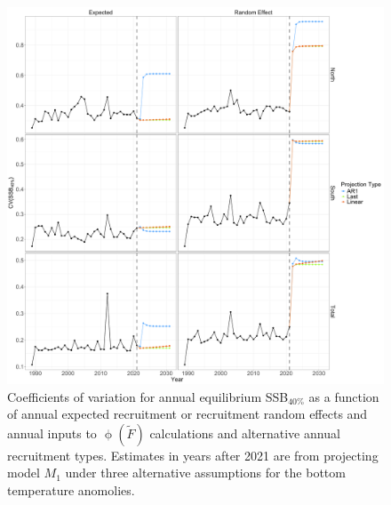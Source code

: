 \documentclass[
]{article}
\begin{document}
\begin{figure}

{\centering \includegraphics[height=0.95\textheight]{proj_SSB40_CV} 

}

\caption{Coefficients of variation for annual equilibrium SSB$_{40\%}$ as a function of annual expected recruitment or recruitment random effects and annual inputs to $\upphi(\widetilde{F})$ calculations and alternative annual recruitment types. Estimates in years after 2021 are from projecting model $M_1$ under three alternative assumptions for the bottom temperature anomolies.}\label{fig:annual-SSB40-cvs}
\end{figure}
\end{document}
